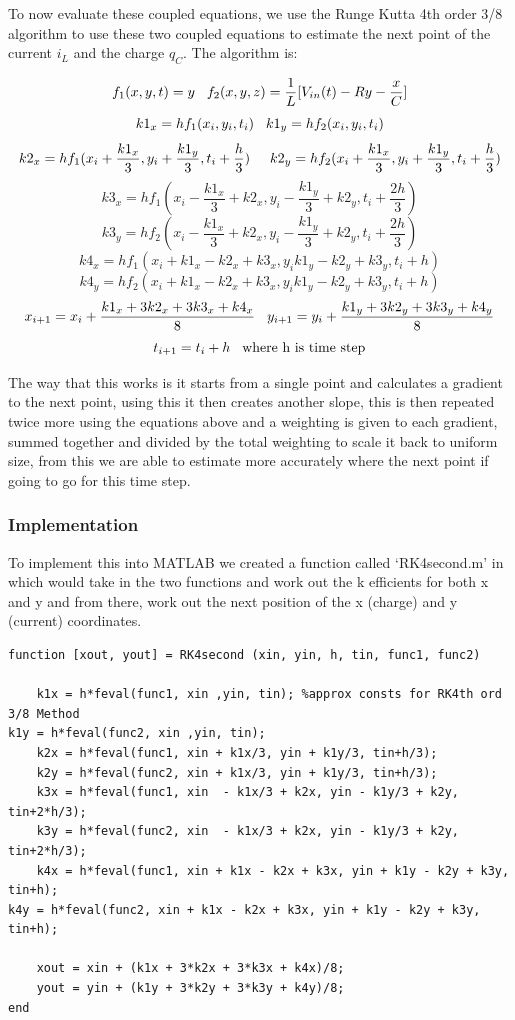 \documentclass[11pt,a4paper]{article}
\begin{document}
To now evaluate these coupled equations, we use the Runge Kutta 4th order 3/8 algorithm to use these two coupled equations to estimate the next point of the current $i_L$ and the charge $q_C$. The algorithm is:

\[f_1(x,y,t) = y \hspace{3mm} f_2(x,y,z) = \frac{1}{L}[V_{in}(t) - Ry - \frac{x}{C}]\]
\[k1_x = hf_1(x_i,y_i,t_i) \hspace{3mm} k1_y = hf_2(x_i,y_i,t_i)\]
\[k2_x = hf_1(x_i+\frac{k1_x}{3},y_i+\frac{k1_y}{3},t_i+\frac{h}{3}) \hspace{5mm} k2_y = hf_2(x_i+\frac{k1_x}{3},y_i+\frac{k1_y}{3},t_i+\frac{h}{3})\]
\[k3_x = hf_1(x_i-\frac{k1_x}{3}+k2_x,y_i-\frac{k1_y}{3}+k2_y,t_i+\frac{2h}{3}) \]
\[k3_y = hf_2(x_i-\frac{k1_x}{3}+k2_x,y_i-\frac{k1_y}{3}+k2_y,t_i+\frac{2h}{3})\]
\[k4_x = hf_1(x_i+k1_x-k2_x+k3_x,y_ik1_y-k2_y+k3_y,t_i+h) \]
\[k4_y = hf_2(x_i+k1_x-k2_x+k3_x,y_ik1_y-k2_y+k3_y,t_i+h)\]
\[x_{i+1} =x_i+\frac{k1_x+3k2_x+3k3_x+k4_x}{8} \hspace{3mm} y_{i+1} =y_i+\frac{k1_y+3k2_y+3k3_y+k4_y}{8}\]
\[t_{i+1} = t_i + h \hspace{3mm} \text{where h is time step}\]

The way that this works is it starts from a single point and calculates a gradient to the next point, using this it then creates another slope, this is then repeated twice more using the equations above and a weighting is given to each gradient, summed together and divided by the total weighting to scale it back to uniform size, from this we are able to estimate more accurately where the next point if going to go for this time step.

\subsubsection{Implementation}

To implement this into MATLAB we created a function called `RK4second.m' in which would take in the two functions and work out the k efficients for both x and y and from there, work out the next position of the x (charge) and y (current) coordinates.

\begin{verbatim}
function [xout, yout] = RK4second (xin, yin, h, tin, func1, func2)

	k1x = h*feval(func1, xin ,yin, tin); %approx consts for RK4th ord 3/8 Method
k1y = h*feval(func2, xin ,yin, tin);
	k2x = h*feval(func1, xin + k1x/3, yin + k1y/3, tin+h/3);
	k2y = h*feval(func2, xin + k1x/3, yin + k1y/3, tin+h/3);
	k3x = h*feval(func1, xin  - k1x/3 + k2x, yin - k1y/3 + k2y, tin+2*h/3);
	k3y = h*feval(func2, xin  - k1x/3 + k2x, yin - k1y/3 + k2y, tin+2*h/3);
	k4x = h*feval(func1, xin + k1x - k2x + k3x, yin + k1y - k2y + k3y, tin+h);
k4y = h*feval(func2, xin + k1x - k2x + k3x, yin + k1y - k2y + k3y, tin+h);

	xout = xin + (k1x + 3*k2x + 3*k3x + k4x)/8;
	yout = yin + (k1y + 3*k2y + 3*k3y + k4y)/8;
end
\end{verbatim}
\end{document}
